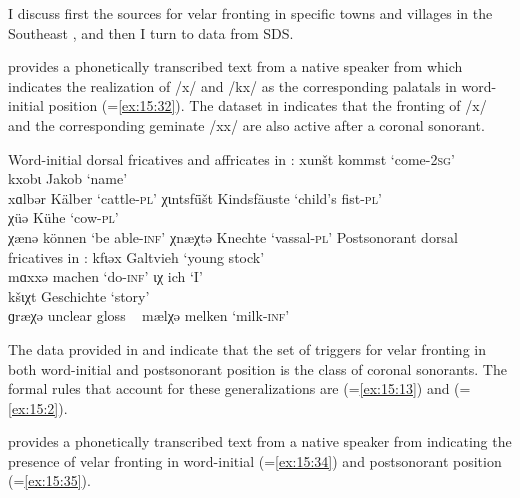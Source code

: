 {I discuss first the sources for velar fronting in specific towns and villages in the Southeast , and then I turn to data from SDS.

\citet{Gröger1914e} provides a phonetically transcribed text from a native speaker from  which indicates the realization of /x/ and /kx/ as the corresponding palatals in word-initial position (=\ref{ex:15:32}). The dataset in  indicates that the fronting of /x/ and the corresponding geminate /xx/ are also active after a coronal sonorant.

\ea%
\label{ex:15:32}
Word-initial dorsal fricatives and affricates in :
\ea\label{ex:15:32a} xunšt \tab [xunʃt] \tab kommst \tab ‘come-\textsc{2}\textsc{sg}’ \\
    kxobɩ \tab [kxobɪ] \tab Jakob \tab ‘name’ \\
    xɑlbər \tab [xɑlbər] \tab Kälber \tab ‘cattle-\textsc{pl}’ 
\ex\label{ex:15:32b} χɩntsf\={ü}št \tab [çɪntsfyːʃt] \tab Kindsfäuste \tab ‘child’s fist-\textsc{pl}’ \\
    χüə  \tab  [çʏə] \tab Kühe \tab ‘cow-\textsc{pl}’ \\
    χænə \tab [çænə] \tab können \tab ‘be able-\textsc{inf}’ 
\ex χnæχtə \tab [çnæçtə] \tab Knechte \tab ‘vassal-\textsc{pl}’ 
\z 
\ex%
\label{ex:15:33}Postsonorant dorsal fricatives in :
\ea\label{ex:15:33a}  kfɩəx \tab [kfɪəx] \tab Galtvieh \tab ‘young stock’ \\
     mɑxxə \tab [mɑxxə] \tab machen \tab ‘do-\textsc{inf}’ 
\ex\label{ex:15:33b}  ɩχ  \tab  [ɪç] \tab ich \tab ‘I’ \\
     kšɩχt \tab [kʃɪçt] \tab Geschichte \tab ‘story’ \\
     ɡræχə \tab [græçə] \tab unclear gloss \tab ~  
\ex\label{ex:15:33c}  mælχə \tab [mælçə] \tab melken \tab ‘milk-\textsc{inf}’ 
\z 
\z 

The data provided in  and  indicate that the set of triggers for velar fronting in both word-initial and postsonorant position is the class of coronal sonorants. The formal rules that account for these generalizations are  (=\ref{ex:15:13}) and  (=\ref{ex:15:2}).

\citet{Gröger1914d} provides a phonetically transcribed text from a native speaker from  indicating the presence of velar fronting in word-initial (=\ref{ex:15:34}) and postsonorant position (=\ref{ex:15:35}).\largerpage[2]


}
